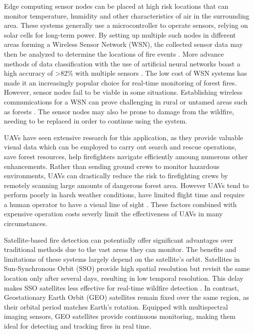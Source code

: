 \documentclass[lettersize,journal]{IEEEtran}
\begin{document}
Edge computing sensor nodes can be placed at high risk locations that
can monitor temperature, humidity and other characteristics of air in
the surrounding area. These systems generally use a microcontroller to
operate sensors, relying on solar cells for long-term power. By setting
up multiple such nodes in different areas forming a Wireless Sensor
Network (WSN), the collected sensor data may then be analyzed to
determine the locations of fire events \cite{MohapatraAnkita2022EWDT}.
More advance methods of data classification with the use of artificial
neural networks boast a high accuracy of \textgreater82\% with multiple
sensors \cite{wsnfire}. The low cost of WSN systems has made it an
increasingly popular choice for real-time monitoring of forest fires.
However, sensor nodes fail to be viable in some situations. Establishing
wireless communications for a WSN can prove challenging in rural or
untamed areas such as forests \cite{wsnyolo}. The sensor nodes may also
be prone to damage from the wildfire, needing to be replaced in order to
continue using the system.

UAVs have seen extensive research for this application, as they provide
valuable visual data which can be employed to carry out search and
rescue operations, save forest resources, help firefighters navigate
efficiently amoung numerous other enhancements. Rather than sending
ground crews to monitor hazardous environments, UAVs can drastically
reduce the risk to firefighting crews by remotely scanning large amounts
of dangerous forest area. However UAVs tend to perform poorly in harsh
weather conditions, have limited flight time and require a human
operator to have a visual line of sight \cite{uav}. These factors
combined with expensive operation costs severly limit the effectiveness
of UAVs in many circumstances.

Satellite-based fire detection can potentially offer significant
advantages over traditional methods due to the vast areas they can
monitor. The benefits and limitations of these systems largely depend on
the satellite's orbit. Satellites in Sun-Synchronous Orbit (SSO) provide
high spatial resolution but revisit the same location only after several
days, resulting in low temporal resolution. This delay makes SSO
satellites less effective for real-time wildfire detection
\cite{satellite}. In contrast, Geostationary Earth Orbit (GEO) satellites
remain fixed over the same region, as their orbital period matches
Earth's rotation. Equipped with multispectral imaging sensors, GEO
satellites provide continuous monitoring, making them ideal for
detecting and tracking fires in real time.
\end{document}
